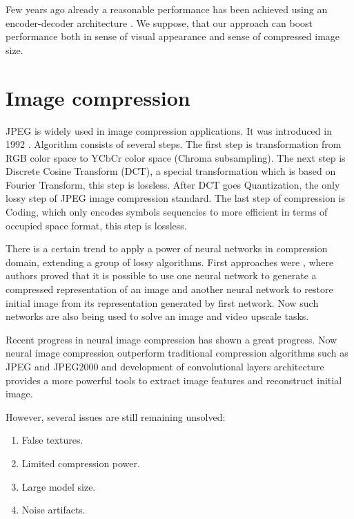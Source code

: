 Few years ago already a reasonable performance has been achieved using an encoder-decoder architecture \cite{theis_lossy_2017}. We suppose, that our approach can boost performance both in sense of visual appearance and sense of compressed image size.

\section{Image compression}

JPEG is widely used in image compression applications. It was introduced in 1992 \cite{wallace_jpeg_1992}. Algorithm consists of several steps. The first step is transformation from RGB color space to YCbCr color space (Chroma subsampling). The next step is Discrete Cosine Transform (DCT), a special transformation which is based on Fourier Transform, this step is lossless. After DCT goes Quantization, the only lossy step of JPEG image compression standard. The last step of compression is Coding, which only encodes symbols sequencies to more efficient in terms of occupied space format, this step is lossless.

There is a certain trend to apply a power of neural networks in compression domain, extending a group of lossy algorithms. First approaches were \cite{himentzer_high_fidelity_2020 Balle_Laparra_Simoncelli_2017, theis_lossy_2017, Toderici_Vincent_Johnston_Hwang_Minnen_Shor_Covell_2017}, where authors proved that it is possible to use one neural network to generate a compressed representation of an image and another neural network to restore initial image from its representation generated by first network. Now such networks are also being used to solve an image and video upscale tasks.

Recent progress in neural image compression has shown a great progress. Now neural image compression outperform traditional compression algorithms such as JPEG and JPEG2000 and development of convolutional layers architecture provides a more powerful tools to extract image features and reconstruct initial image.

However, several issues are still remaining unsolved:

\begin{enumerate}
    \item False textures.
    \item Limited compression power.
    \item Large model size.
    \item Noise artifacts.
\end{enumerate}

